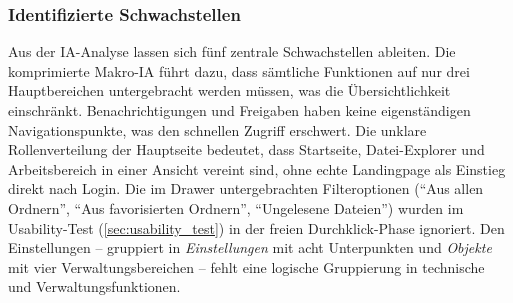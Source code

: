 \subsubsection{Identifizierte Schwachstellen}\label{sub:ia_schwachstellen}

Aus der IA-Analyse lassen sich fünf zentrale Schwachstellen ableiten. Die komprimierte Makro-IA führt dazu, dass sämtliche Funktionen auf nur drei Hauptbereichen untergebracht werden müssen, was die Übersichtlichkeit einschränkt. Benachrichtigungen und Freigaben haben keine eigenständigen Navigationspunkte, was den schnellen Zugriff erschwert. Die unklare Rollenverteilung der Hauptseite bedeutet, dass Startseite, Datei-Explorer und Arbeitsbereich in einer Ansicht vereint sind, ohne echte Landingpage als Einstieg direkt nach Login. Die im Drawer untergebrachten Filteroptionen (\enquote{Aus allen Ordnern}, \enquote{Aus favorisierten Ordnern}, \enquote{Ungelesene Dateien}) wurden im Usability-Test (\autoref{sec:usability_test}) in der freien Durchklick-Phase ignoriert. Den Einstellungen -- gruppiert in \emph{Einstellungen} mit acht Unterpunkten und \emph{Objekte} mit vier Verwaltungsbereichen -- fehlt eine logische Gruppierung in technische und Verwaltungsfunktionen.
